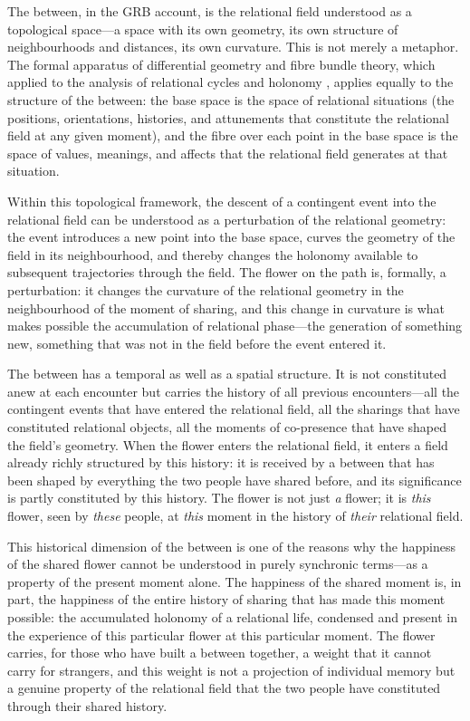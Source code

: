 The between, in the GRB account, is the relational field understood as a topological space---a space with its own geometry, its own structure of neighbourhoods and distances, its own curvature. This is not merely a metaphor. The formal apparatus of differential geometry and fibre bundle theory, which  applied to the analysis of relational cycles and holonomy \parencite{paperix}, applies equally to the structure of the between: the base space is the space of relational situations (the positions, orientations, histories, and attunements that constitute the relational field at any given moment), and the fibre over each point in the base space is the space of values, meanings, and affects that the relational field generates at that situation.

Within this topological framework, the descent of a contingent event into the relational field can be understood as a perturbation of the relational geometry: the event introduces a new point into the base space, curves the geometry of the field in its neighbourhood, and thereby changes the holonomy available to subsequent trajectories through the field. The flower on the path is, formally, a perturbation: it changes the curvature of the relational geometry in the neighbourhood of the moment of sharing, and this change in curvature is what makes possible the accumulation of relational phase---the generation of something new, something that was not in the field before the event entered it.

The between has a temporal as well as a spatial structure. It is not constituted anew at each encounter but carries the history of all previous encounters---all the contingent events that have entered the relational field, all the sharings that have constituted relational objects, all the moments of co-presence that have shaped the field's geometry. When the flower enters the relational field, it enters a field already richly structured by this history: it is received by a between that has been shaped by everything the two people have shared before, and its significance is partly constituted by this history. The flower is not just \emph{a} flower; it is \emph{this} flower, seen by \emph{these} people, at \emph{this} moment in the history of \emph{their} relational field.

This historical dimension of the between is one of the reasons why the happiness of the shared flower cannot be understood in purely synchronic terms---as a property of the present moment alone. The happiness of the shared moment is, in part, the happiness of the entire history of sharing that has made this moment possible: the accumulated holonomy of a relational life, condensed and present in the experience of this particular flower at this particular moment. The flower carries, for those who have built a between together, a weight that it cannot carry for strangers, and this weight is not a projection of individual memory but a genuine property of the relational field that the two people have constituted through their shared history.

